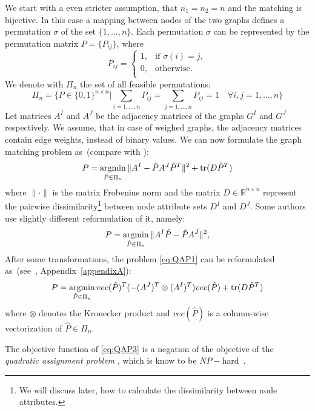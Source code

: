 We start with a even stricter assumption, that $n_1=n_2=n$ and the matching is bijective. In this case a mapping between nodes of the two graphs defines a permutation $\sigma$ of the set $\{1,\dots,n\}$. Each permutation $\sigma$ can be represented by the permutation matrix $P=\{P_{ij}\}$, where
\begin{equation*}
P_{ij}=\begin{cases}
 1, & \text{if } \sigma(i)=j, \\
 0, & \text{otherwise.} \\
\end{cases}
\end{equation*}
We denote with $\Pi_n$ the set of all feasible permutations:
\begin{equation*}
\Pi_n=\{P\in\{0,1\}^{n\times n}|\sum_{i=1,\dots,n}P_{ij}=\sum_{j=1,\dots,n}P_{ij}=1\quad\forall i,j=1,\dots,n\}
\end{equation*}
Let matrices $A^I$ and $A^J$ be the adjacency matrices of the graphs $G^I$ and $G^J$ respectively. We assume, that in case of weighed graphs, the adjacency matrices contain edge weights, instead of binary values. We can now formulate the graph matching problem as~(compare with \cite{FastPFP,Roth2001}):
\begin{equation} \label{eq:QAP1}
P = \mathop{\rm argmin}_{\hat{P}\in\Pi_n}\|A^I-\hat{P}A^J\hat{P}^T\|^2+\mathop{\rm tr}(D\hat{P}^T)
\end{equation}
where $\|\cdot\|$ is the matrix Frobenius norm and the matrix $D\in\mathbb{R}^{n\times n}$ represent the pairwise dissimilarity\footnote{We will discuss later, how to calculate the dissimilarity between node attributes.} between node attribute sets $D^I$ and $D^J$. Some authors~\cite{Vogelstein_BrainGraphs} use slightly different reformulation of it, namely:
\begin{equation} \label{eq:QAP2}
P = \mathop{\rm argmin}_{\hat{P}\in\Pi_n}\|A^I\hat{P}-\hat{P}A^J\|^2,
\end{equation}
After some transformations, the problem \eqref{eq:QAP1} can be reformulated as~(see~\cite{Burkard98thequadratic}, Appendix~\ref{appendixA}):
\begin{equation} \label{eq:QAP3}
P = \mathop{\rm argmin}_{\hat{P}\in\Pi_n}vec(\hat{P})^T(-(A^J)^T\otimes(A^I)^T)vec(\hat{P})+\mathop{\rm tr}(D\hat{P}^T)
\end{equation}
where $\otimes$ denotes the Kronecker product and $vec(\hat{P})$ is a column-wise vectorization of $\hat{P}\in\Pi_n$.

The objective function of \eqref{eq:QAP3} is a negation of the objective of the \emph{quadratic assignment problem}%
, which is know to be $NP-$hard~\cite{Burkard98thequadratic,Sahni1974}.

